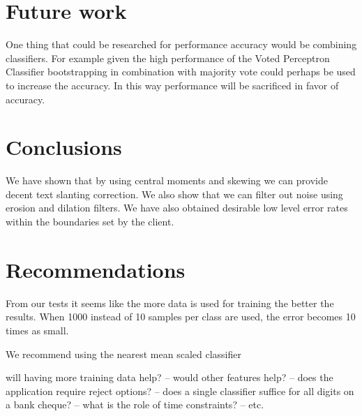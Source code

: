 \documentclass[%
        compressed,
        final,
        notitlepage,
        narroweqnarray,
        inline,
        twoside,
        ]{ieee}
\begin{document}
\section{Future work}
One thing that could be researched for performance accuracy would be combining
classifiers. For example given the high performance of the Voted Perceptron
Classifier bootstrapping in combination with majority vote could perhaps be used to
increase the accuracy. In this way performance will be sacrificed in
favor of accuracy.

\section{Conclusions}
We have shown that by using central moments and skewing we can provide decent
text slanting correction. We also show that we can filter out noise using
erosion and dilation filters. We have also obtained desirable low level error
rates within the boundaries set by the client.

\section{Recommendations}
From our tests it seems like the more data is used for training the better the
results. When 1000 instead of 10 samples per class are used, the error becomes
10 times as small.



We recommend using the nearest mean scaled classifier 

 will having more training data help?
 – would other features help?
 – does the application require reject options?
 – does a single classifier suffice for all digits on a bank cheque?
 – what is the role of time constraints?
 – etc.
\end{document}
